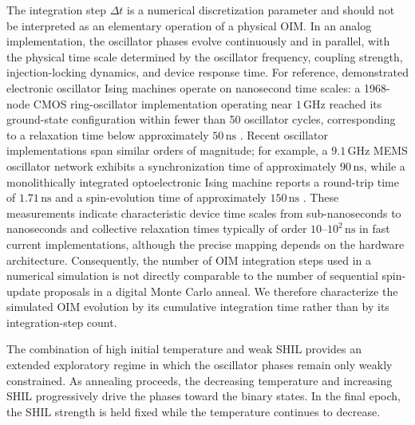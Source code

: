 \documentclass[
reprint,
amsmath,amssymb,
aps,
pre,
floatfix,
]{revtex4-2}
\begin{document}
The integration step $\Delta t$ is a numerical discretization parameter and
should not be interpreted as an elementary operation of a physical OIM.
In an analog implementation, the oscillator phases evolve continuously and
in parallel, with the physical time scale determined by the oscillator
frequency, coupling strength, injection-locking dynamics, and device response
time. For reference, demonstrated electronic oscillator Ising machines operate
on nanosecond time scales: a 1968-node CMOS ring-oscillator implementation
operating near $1\,\mathrm{GHz}$ reached its ground-state configuration within
fewer than 50 oscillator cycles, corresponding to a relaxation time below
approximately $50\,\mathrm{ns}$ \cite{Energy4}. Recent oscillator
implementations span similar orders of magnitude; for example, a
$9.1\,\mathrm{GHz}$ MEMS oscillator network exhibits a synchronization time of
approximately $90\,\mathrm{ns}$, while a monolithically integrated
optoelectronic Ising machine reports a round-trip time of $1.71\,\mathrm{ns}$
and a spin-evolution time of approximately $150\,\mathrm{ns}$
\cite{Deng2024,Wu2025}. These measurements indicate characteristic device
time scales from sub-nanoseconds to nanoseconds and collective relaxation
times typically of order $10$--$10^2\,\mathrm{ns}$ in fast current
implementations, although the precise mapping depends on the hardware
architecture. Consequently, the number of OIM integration steps used in a
numerical simulation is not directly comparable to the number of sequential
spin-update proposals in a digital Monte Carlo anneal. We therefore
characterize the simulated OIM evolution by its cumulative integration time
rather than by its integration-step count.

The combination of high initial temperature and weak SHIL provides an
extended exploratory regime in which the oscillator phases remain only
weakly constrained. As annealing proceeds, the decreasing temperature and
increasing SHIL progressively drive the phases toward the binary states.
In the final epoch, the SHIL strength is held fixed while the temperature
continues to decrease.
\end{document}

